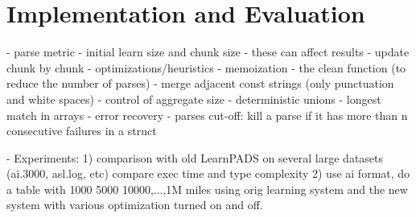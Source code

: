 \section{Implementation and Evaluation}
\label{sec:imp}

 - parse metric
 - initial learn size and chunk size - these can affect results
 - update chunk by chunk 
 - optimizations/heuristics
   - memoization
   - the clean function (to reduce the number of parses)
   - merge adjacent const strings (only punctuation and white spaces)
   - control of aggregate size
   - deterministic unions
   - longest match in arrays
   - error recovery
   - parses cut-off: kill a parse if it has more than n consecutive failures in a struct

 - Experiments:
	1) comparison with old LearnPADS on several large datasets (ai.3000, asl.log, etc)
	   compare exec time and type complexity
	2) use ai format, do a table with 1000 5000 10000,...,1M miles
	   using orig learning system and the new system with various optimization turned on and off.

